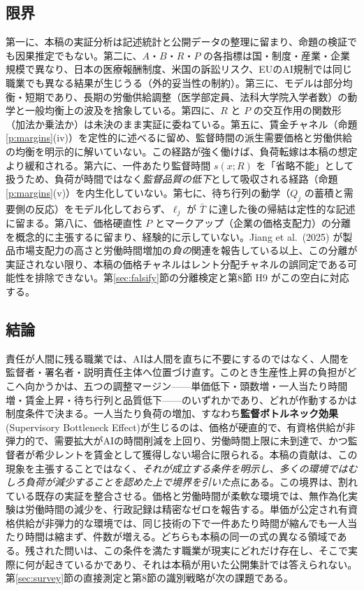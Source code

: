 \documentclass[11pt]{article}
\theoremstyle{plain}
\theoremstyle{definition}
\theoremstyle{remark}
\begin{document}
\subsection{限界}
第一に、本稿の実証分析は記述統計と公開データの整理に留まり、命題の検証でも因果推定でもない。第二に、$A$・$B$・$R$・$P$ の各指標は国・制度・産業・企業規模で異なり、日本の医療報酬制度、米国の訴訟リスク、EUのAI規制では同じ職業でも異なる結果が生じうる（外的妥当性の制約）。第三に、モデルは部分均衡・短期であり、長期の労働供給調整（医学部定員、法科大学院入学者数）の動学と一般均衡上の波及を捨象している。第四に、$R$ と $P$ の交互作用の関数形（加法か乗法か）は未決のまま実証に委ねている。第五に、賃金チャネル（命題\ref{p:margins}(iv)）を定性的に述べるに留め、監督時間の派生需要価格と労働供給の均衡を明示的に解いていない。この経路が強く働けば、負荷転嫁は本稿の想定より緩和される。第六に、一件あたり監督時間 $s(x;R)$ を「省略不能」として扱うため、負荷が時間ではなく\emph{監督品質の低下}として吸収される経路（命題\ref{p:margins}(v)）を内生化していない。第七に、待ち行列の動学（$Q_j$ の蓄積と需要側の反応）をモデル化しておらず、$\ell_j$ が $\bar T$ に達した後の帰結は定性的な記述に留まる。第八に、価格硬直性 $P$ とマークアップ（企業の価格支配力）の分離を概念的に主張するに留まり、経験的に示していない。Jiang et al.\ (2025) が製品市場支配力の高さと労働時間増加の\emph{負の}関連を報告している以上、この分離が実証されない限り、本稿の価格チャネルはレント分配チャネルの誤同定である可能性を排除できない。第\ref{sec:falsify}節の分離検定と第8節 H9 がこの空白に対応する。

\subsection{結論}
\begin{claimbox}
責任が人間に残る職業では、AIは人間を直ちに不要にするのではなく、人間を監督者・署名者・説明責任主体へ位置づけ直す。このとき生産性上昇の負担がどこへ向かうかは、五つの調整マージン——単価低下・頭数増・一人当たり時間増・賃金上昇・待ち行列と品質低下——のいずれかであり、どれが作動するかは制度条件で決まる。一人当たり負荷の増加、すなわち\textbf{監督ボトルネック効果}(Supervisory Bottleneck Effect)が生じるのは、価格が硬直的で、有資格供給が非弾力的で、需要拡大がAIの時間削減を上回り、労働時間上限に未到達で、かつ監督者が希少レントを賃金として獲得しない場合に限られる。本稿の貢献は、この現象を主張することではなく、\emph{それが成立する条件を明示し、多くの環境ではむしろ負荷が減少することを認めた上で境界を引いた}点にある。この境界は、割れている既存の実証を整合させる。価格と労働時間が柔軟な環境では、無作為化実験は労働時間の減少を、行政記録は精密なゼロを報告する。単価が公定され有資格供給が非弾力的な環境では、同じ技術の下で一件あたり時間が縮んでも一人当たり時間は縮まず、件数が増える。どちらも本稿の同一の式の異なる領域である。残された問いは、この条件を満たす職業が現実にどれだけ存在し、そこで実際に何が起きているかであり、それは本稿が用いた公開集計では答えられない。第\ref{sec:survey}節の直接測定と第8節の識別戦略が次の課題である。
\end{claimbox}
\end{document}

